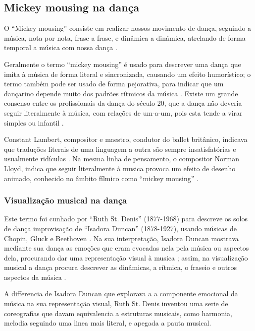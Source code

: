 \subsection{Mickey mousing na dança} 

O ``Mickey mousing'' consiste em realizar nossos movimento de dança,
seguindo a música, nota por nota, frase a frase, e dinâmica a dinâmica,
atrelando de forma temporal a música com nossa dança
\cite[pp. 460]{preston1995dance}.

Geralmente o termo ``mickey mousing'' é usado para descrever 
uma dança que imita à música de forma literal e sincronizada, causando um efeito humorístico;
o termo também pode ser usado de forma pejorativa, 
para indicar que um dançarino depende muito dos padrões rítmicos da música \cite{butterworth2011dance}.
Existe um grande consenso entre os profissionais da dança do século 20,
que a dança não deveria seguir literalmente à música, com relações de um-a-um, 
pois esta tende a virar simples ou infantil \cite[pp. 242-243]{dithmer2002another}.

Constant Lambert,  compositor e maestro, condutor do ballet britânico,
indicava que traduções literais de uma linguagem a outra são sempre insatisfatórias 
e usualmente ridículas \cite[pp. 242-243]{dithmer2002another}.
Na mesma linha de pensamento, o compositor Norman Lloyd,
indica que seguir literalmente à musica provoca um efeito de desenho animado,
conhecido no âmbito fílmico como ``mickey mousing''
\cite[pp. 242-243]{dithmer2002another}.

\subsubsection{Visualização musical na dança}
\label{subsubsec:musicvisualization}
Este termo foi cunhado por ``Ruth St. Denis'' (1877-1968) 
para descreve os solos de dança improvisação  de ``Isadora Duncan'' (1878-1927),
usando músicas de Chopin, Gluck e Beethoven \cite{butterworth2011dance} \cite[pp. 473]{runco1999encyclopedia}.
Na sua interpretação, 
Isadora Duncan mostrava mediante sua dança as emoções que eram evocadas nela pela música 
ou aspectos dela, procurando dar uma representação visual à musica
\cite{butterworth2011dance} \cite[pp. 473]{runco1999encyclopedia};
assim, na visualização musical a dança procura descrever as dinâmicas, a rítmica, o fraseio 
e outros aspectos da música \cite[pp. 29]{schrader2005sense}.

A differencia de Isadora Duncan que explorava a a componente emocional da música na sua representação visual,
Ruth St. Denis inventou uma serie de coreografias que davam equivalencia a estruturas musicais,
como harmonia, melodia \cite[pp. 149]{walden2013representation} seguindo uma linea mais literal,
e apegada a pauta musical.

